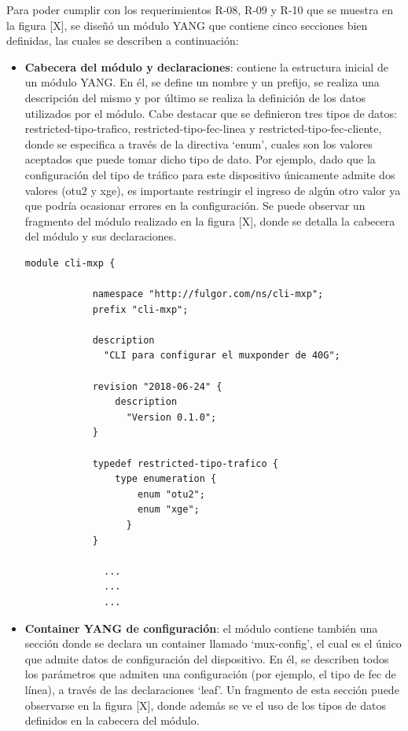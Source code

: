 Para poder cumplir con los requerimientos R-08, R-09 y R-10 que se muestra en la figura [X], se diseñó un módulo YANG que contiene cinco secciones bien definidas, las cuales se describen a continuación: 

\begin{itemize}
	\item \textbf{Cabecera del módulo y declaraciones}: contiene la estructura inicial de un módulo YANG. En él, se define un nombre y un prefijo, se realiza una descripción del mismo y por último se realiza la definición de los datos utilizados por el módulo. Cabe destacar que se definieron tres tipos de datos: restricted-tipo-trafico, restricted-tipo-fec-linea y restricted-tipo-fec-cliente, donde se especifica a través de la directiva ‘enum’, cuales son los valores aceptados que puede tomar dicho tipo de dato. Por ejemplo, dado que la configuración del tipo de tráfico para este dispositivo únicamente admite dos valores (otu2 y xge), es importante restringir el ingreso de algún otro valor ya que podría ocasionar errores en la configuración. Se puede observar un fragmento del módulo realizado en la figura [X], donde se detalla la cabecera del módulo y sus declaraciones.  

    \begin{lstlisting}[language=SHELXL, caption=Interacción tipica con un dispositivo mediante \textit{CLI}., label=lstlisting:cli]
        module cli-mxp {

            namespace "http://fulgor.com/ns/cli-mxp";
            prefix "cli-mxp";
        
            description
              "CLI para configurar el muxponder de 40G";
        
            revision "2018-06-24" {
                description
                  "Version 0.1.0";
            }
            
            typedef restricted-tipo-trafico {
                type enumeration {
                    enum "otu2";
                    enum "xge";
                  }
            }
        
              ...
              ...
              ...
    \end{lstlisting}

    \item \textbf{Container YANG de configuración}: el módulo contiene también una sección donde se declara un container llamado ‘mux-config’, el cual es el único que admite datos de configuración del dispositivo. En él, se describen todos los parámetros que admiten una configuración (por ejemplo, el tipo de fec de línea), a través de las declaraciones ‘leaf’. Un fragmento de esta sección puede observarse en la figura [X], donde además se ve el uso de los tipos de datos definidos en la cabecera del módulo.
  

\end{itemize}
